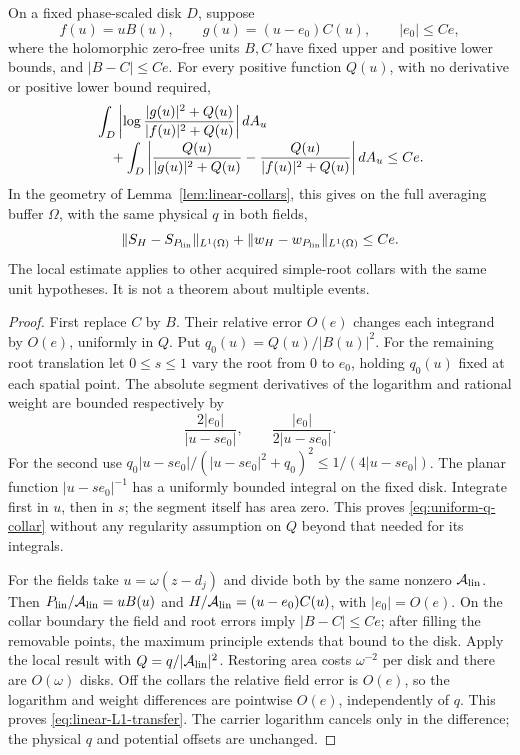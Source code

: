 \begin{lemma}
\label{lem:uniform-q-collar}
On a fixed phase-scaled disk $D$, suppose
\[
 f(u)=uB(u),\qquad g(u)=(u-e_0)C(u),\qquad |e_0|\le Ce,
\]
where the holomorphic zero-free units $B,C$ have fixed upper and
positive lower bounds, and $|B-C|\le Ce$.  For every positive function
$Q(u)$, with no derivative or positive lower bound required,
\begin{align}
 &\int_D\left|\log\frac{|g(u)|^2+Q(u)}{|f(u)|^2+Q(u)}\right|dA_u
 \notag\\[-2pt]
 &\quad+\int_D\left|\frac{Q(u)}{|g(u)|^2+Q(u)}
             -\frac{Q(u)}{|f(u)|^2+Q(u)}\right|dA_u\le Ce.
 \label{eq:uniform-q-collar}
\end{align}
In the geometry of Lemma~\ref{lem:linear-collars}, this gives on the
full averaging buffer $\Omega$, with the same physical $q$ in both fields,
\begin{equation}
 \|S_H-S_{P_{\rm lin}}\|_{L^1(\Omega)}
       +\|w_H-w_{P_{\rm lin}}\|_{L^1(\Omega)}\le Ce.
 \label{eq:linear-L1-transfer}
\end{equation}
The local estimate applies to other acquired simple-root collars with
the same unit hypotheses.  It is not a theorem about multiple events.
\end{lemma}
\begin{proof}
First replace $C$ by $B$.  Their relative error $O(e)$ changes each
integrand by $O(e)$, uniformly in $Q$.  Put $q_0(u)=Q(u)/|B(u)|^2$.
For the remaining root translation let $0\le s\le1$ vary the root
from $0$ to $e_0$, holding $q_0(u)$ fixed at each spatial point.
The absolute segment derivatives of the logarithm and rational weight
are bounded respectively by
\begin{equation}
 \frac{2|e_0|}{|u-se_0|},\qquad
 \frac{|e_0|}{2|u-se_0|}.
 \label{eq:uniform-q-derivatives}
\end{equation}
For the second use
$q_0|u-se_0|/(|u-se_0|^2+q_0)^2\le1/(4|u-se_0|)$.
The planar function $|u-se_0|^{-1}$ has a uniformly bounded integral
on the fixed disk.  Integrate first in $u$, then in $s$; the segment
itself has area zero.  This proves \eqref{eq:uniform-q-collar} without
any regularity assumption on $Q$ beyond that needed for its integrals.

For the fields take $u=\omega(z-d_j)$ and divide both by the same
nonzero $\mathcal A_{\rm lin}$.  Then
$P_{\rm lin}/\mathcal A_{\rm lin}=uB(u)$ and
$H/\mathcal A_{\rm lin}=(u-e_0)C(u)$, with $|e_0|=O(e)$.
On the collar boundary the field and root errors imply $|B-C|\le Ce$;
after filling the removable points, the maximum principle extends
that bound to the disk.  Apply the local result with
$Q=q/|\mathcal A_{\rm lin}|^2$.  Restoring area costs $\omega^{-2}$
per disk and there are $O(\omega)$ disks.  Off the collars the relative
field error is $O(e)$, so the logarithm and weight differences are
pointwise $O(e)$, independently of $q$.  This proves
\eqref{eq:linear-L1-transfer}.  The carrier logarithm cancels only in
the difference; the physical $q$ and potential offsets are unchanged.
\end{proof}

